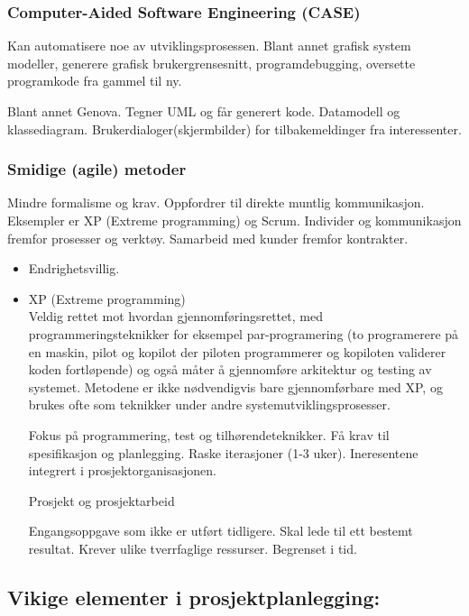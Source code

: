 \documentclass[11pt]{article}
\begin{document}
\subsubsection{Computer-Aided Software Engineering (CASE)}
\label{sec-4.1.11}


    Kan automatisere noe av utviklingsprosessen.
    Blant annet grafisk system modeller, generere grafisk brukergrensesnitt, programdebugging, oversette programkode fra gammel til ny.

    Blant annet Genova. Tegner UML og får generert kode.
    Datamodell og klassediagram.
    Brukerdialoger(skjermbilder) for tilbakemeldinger fra interessenter.
\subsubsection{Smidige (agile) metoder}
\label{sec-4.1.12}


    Mindre formalisme og krav. Oppfordrer til direkte muntlig kommunikasjon. Eksempler er XP (Extreme programming) og Scrum.
    Individer og kommunikasjon fremfor prosesser og verktøy. Samarbeid med kunder fremfor kontrakter.
\begin{itemize}
\item Endrighetsvillig.
\end{itemize}
\begin{itemize}

\item XP (Extreme programming)\\
\label{sec-4.1.12.1}%
Veldig rettet mot hvordan gjennomføringsrettet, med programmeringsteknikker
     for eksempel par-programering (to programerere på en maskin, pilot og kopilot
     der piloten programmerer og kopiloten validerer koden fortløpende) og også
     måter å gjennomføre arkitektur og testing av systemet. Metodene er ikke
     nødvendigvis bare gjennomførbare med XP, og brukes ofte som teknikker under
     andre systemutviklingsprosesser.

     Fokus på programmering, test og tilhørendeteknikker.
     Få krav til spesifikasjon og planlegging. Raske iterasjoner (1-3 uker).
     Ineresentene integrert i prosjektorganisasjonen.

     Prosjekt og prosjektarbeid

     Engangsoppgave som ikke er utført tidligere. Skal lede til ett bestemt resultat. Krever ulike tverrfaglige ressurser. Begrenset i tid.

\end{itemize} %
\subsection{Vikige elementer i prosjektplanlegging:}
\label{sec-4.2}
\end{document}
